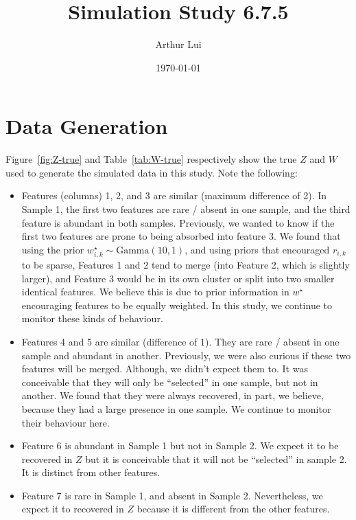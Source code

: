 \documentclass[10pt]{article} %
\title{Simulation Study 6.7.5}
\author{Arthur Lui}
\date{\today} %
\newcommand{\Gam}{ \text{Gamma} }
\begin{document}
\maketitle



\section{Data Generation}\label{sec:data-generation}
Figure~\ref{fig:Z-true} and Table~\ref{tab:W-true} respectively show the true
$Z$ and $W$ used to generate the simulated data in this study. Note the following:
\begin{itemize}
  \item Features (columns) 1, 2, and 3 are similar (maximum difference of 2).
    In Sample 1, the first two features are rare / absent in one sample, and
    the third feature is abundant in both samples. Previously, we wanted to
    know if the first two features are prone to being absorbed into feature 3. We
    found that using the prior $w^\star_{i,k} \sim \Gam(10, 1)$, and using priors
    that encouraged $r_{i,k}$ to be sparse, Features 1 and 2 tend to merge
    (into Feature 2, which is slightly larger), and Feature 3 would be in its
    own cluster or split into two smaller identical features. We believe this is 
    due to prior information in $w^\star$ encouraging features to be equally weighted.
    In this study, we continue to monitor these kinds of behaviour.
  \item Features 4 and 5 are similar (difference of 1). They are rare / absent
    in one sample and abundant in another. Previously, we were also curious if
    these two features will be merged. Although, we didn't expect them to. It was
    conceivable that they will only be ``selected'' in one sample, but not in
    another. We found that they were always recovered, in part, we believe, because
    they had a large presence in one sample. We continue to monitor their behaviour
    here.
  \item Feature 6 is abundant in Sample 1 but not in Sample 2. We expect it to be
    recovered in $Z$ but it is conceivable that it will not be ``selected'' in sample
    2. It is distinct from other features.
  \item Feature 7 is rare in Sample 1, and absent in Sample 2. Nevertheless, we
    expect it to recovered in $Z$ because it is different from the other
    features.
\end{itemize}
\end{document}
